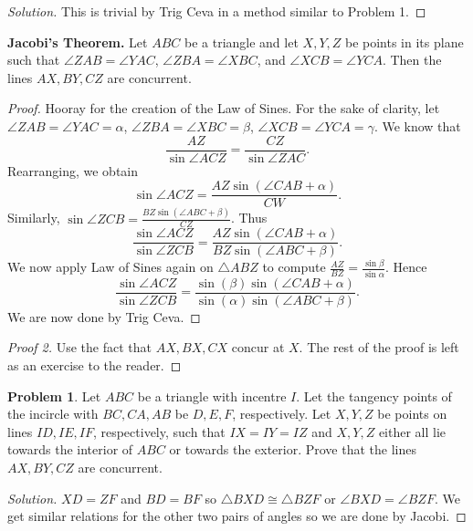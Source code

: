\documentclass[a4paper]{article}
\theoremstyle{definition}
\newtheorem{problem}{Problem}[subsection]
\begin{document}
\begin{proof}[Solution]
This is trivial by Trig Ceva in a method similar to Problem 1.
\end{proof}

\textbf{Jacobi's Theorem.} Let $ABC$ be a triangle and let $X, Y, Z$ be points in its plane such that $\angle ZAB = \angle YAC$, $\angle ZBA = \angle XBC$, and $\angle XCB = \angle YCA$. Then the lines $AX, BY, CZ$ are concurrent.

\begin{proof}
Hooray for the creation of the Law of Sines. For the sake of clarity, let $\angle ZAB = \angle YAC = \alpha$, $\angle ZBA = \angle XBC = \beta$, $\angle XCB = \angle YCA = \gamma$. We know that
\[ \frac{AZ}{\sin \angle ACZ} = \frac{CZ}{\sin \angle ZAC}. \]
Rearranging, we obtain
\[ \sin \angle ACZ = \frac{AZ \sin\left(\angle CAB + \alpha\right)}{CW}. \]
Similarly, $\sin \angle ZCB = \frac{BZ \sin\left(\angle ABC + \beta\right)}{CZ}$. Thus
\[ \frac{\sin \angle ACZ}{\sin \angle ZCB} = \frac{AZ \sin\left(\angle CAB + \alpha\right)}{BZ \sin\left(\angle ABC + \beta\right)}. \]
We now apply Law of Sines again on $\triangle ABZ$ to compute $\frac{AZ}{BZ} = \frac{\sin \beta}{\sin \alpha}$. Hence
\[ \frac{\sin \angle ACZ}{\sin \angle ZCB} = \frac{\sin\left(\beta\right) \sin\left(\angle CAB + \alpha\right)}{\sin\left(\alpha\right) \sin\left(\angle ABC + \beta\right)}. \]
We are now done by Trig Ceva.
\end{proof}

\begin{proof}[Proof 2]
Use the fact that $AX, BX, CX$ concur at $X$. The rest of the proof is left as an exercise to the reader.
\end{proof}

\begin{problem}
Let $ABC$ be a triangle with incentre $I$. Let the tangency points of the incircle with $BC, CA, AB$ be $D, E, F$, respectively. Let $X, Y, Z$ be points on lines $ID, IE, IF$, respectively, such that $IX = IY = IZ$ and $X, Y, Z$ either all lie towards the interior of $ABC$ or towards the exterior. Prove that the lines $AX, BY, CZ$ are concurrent.
\end{problem}

\begin{proof}[Solution]
$XD = ZF$ and $BD = BF$ so $\triangle BXD \cong \triangle BZF$ or $\angle BXD = \angle BZF$. We get similar relations for the other two pairs of angles so we are done by Jacobi.
\end{proof}
\end{document}
